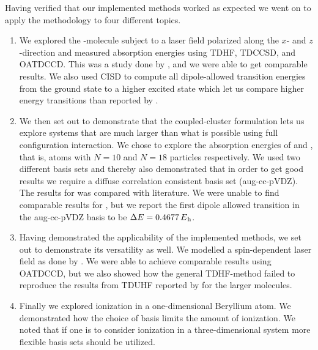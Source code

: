     Having verified that our implemented methods worked as expected we went on
    to apply the methodology to four different topics.
    \begin{enumerate}
        \item We explored the -molecule subject to a laser field
            polarized along the $x$- and $z$-direction and measured absorption
            energies using TDHF, TDCCSD, and OATDCCD.
            This was a study done by \citeauthor{nest} \cite{nest}, and we were
            able to get comparable results.
            We also used CISD to compute all dipole-allowed transition energies
            from the ground state to a higher excited state which let us compare
            higher energy transitions than reported by \citeauthor{nest}.
        \item We then set out to demonstrate that the coupled-cluster
            formulation lets us explore systems that are much larger than what
            is possible using full configuration interaction.
            We chose to explore the absorption energies of  and ,
            that is, atoms with $N = 10$ and $N = 18$ particles respectively.
            We used two different basis sets and thereby also demonstrated that
            in order to get good results we require a diffuse correlation
            consistent basis set (aug-cc-pVDZ).
            The results for  was compared with literature.
            We were unable to find comparable results for , but we report
            the first dipole allowed transition in the aug-cc-pVDZ basis to be
            $\Delta\energy = \SI{0.4677}{\hartree}$.
        \item Having demonstrated the applicability of the implemented methods,
            we set out to demonstrate its versatility as well.
            We modelled a spin-dependent laser field as done by
            \citeauthor{isborn} \cite{isborn}.
            We were able to achieve comparable results using OATDCCD, but we
            also showed how the general TDHF-method failed to reproduce the
            results from TDUHF reported by \citeauthor{isborn} for the larger
            molecules.
        \item Finally we explored ionization in a one-dimensional Beryllium
            atom.
            We demonstrated how the choice of basis limits the amount of
            ionization.
            We noted that if one is to consider ionization in a
            three-dimensional system more flexible basis sets should be
            utilized.
    \end{enumerate}
